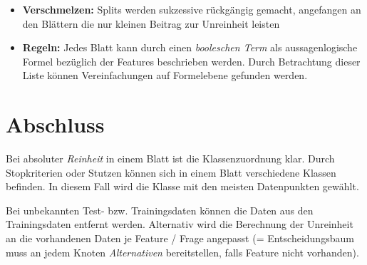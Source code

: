 \documentclass{report}
\begin{document}
\begin{itemize}
  \item \textbf{Verschmelzen:} Splits werden sukzessive rückgängig gemacht, angefangen an den Blättern die nur kleinen
  Beitrag zur Unreinheit leisten
  \item \textbf{Regeln:} Jedes Blatt kann durch einen \textit{booleschen Term} als aussagenlogische Formel bezüglich der
  Features beschrieben werden. Durch Betrachtung dieser Liste können Vereinfachungen auf Formelebene gefunden werden.
\end{itemize}

\section{Abschluss}

Bei absoluter \textit{Reinheit} in einem Blatt ist die Klassenzuordnung klar. Durch Stopkriterien oder Stutzen können sich in einem
Blatt verschiedene Klassen befinden. In diesem Fall wird die Klasse mit den meisten Datenpunkten gewählt.\par

Bei unbekannten Test- bzw. Trainingsdaten können die Daten aus den Trainingsdaten entfernt werden. Alternativ wird die
Berechnung der Unreinheit an die vorhandenen Daten je Feature / Frage angepasst (= Entscheidungsbaum muss an jedem Knoten
\textit{Alternativen} bereitstellen, falls Feature nicht vorhanden).
\end{document}
